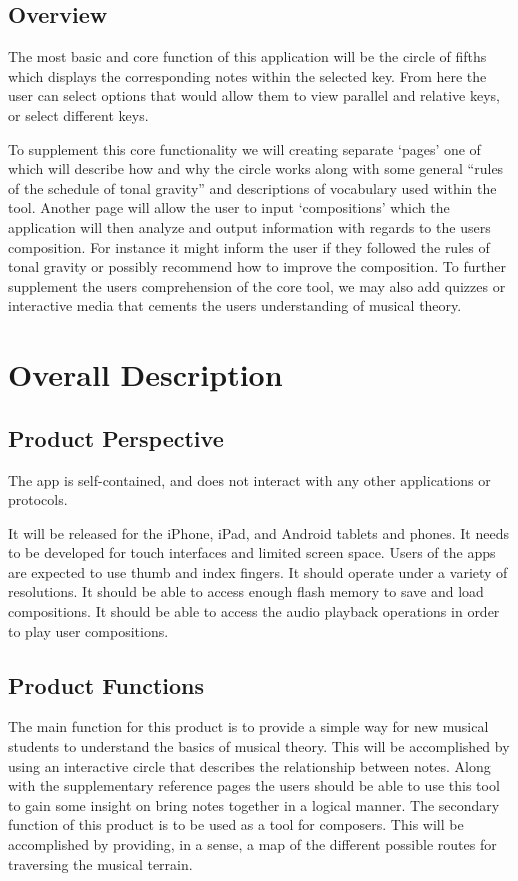 \documentclass[onecolumn, draftclsnofoot,10pt, compsoc]{IEEEtran}
\begin{document}
\subsection{Overview}
\par
The most basic and core function of this application will be the circle of fifths which displays the corresponding notes within the selected key. 
From here the user can select options that would allow them to view parallel and relative keys, or select different keys. 

\par
To supplement this core functionality we will creating separate ‘pages’ one of which will describe how and why the circle works along with some general “rules of the schedule of tonal gravity” and descriptions of vocabulary used within the tool.
Another page will allow the user to input ‘compositions’ which the application will then analyze and output information with regards to the users composition.
For instance it might inform the user if they followed the rules of tonal gravity or possibly recommend how to improve the composition.
To further supplement the users comprehension of the core tool, we may also add quizzes or interactive media that cements the users understanding of musical theory. 

\pagebreak
\section{Overall Description}
\subsection{Product Perspective}
\par
The app is self-contained, and does not interact with any other applications or protocols. 
\par 
It will be released for the iPhone, iPad, and Android tablets and phones.
It needs to be developed for touch interfaces and limited screen space.
Users of the apps are expected to use thumb and index fingers.
It should operate under a variety of resolutions.
It should be able to access enough flash memory to save and load compositions.
It should be able to access the audio playback operations in order to play user compositions.

\subsection{Product Functions}
\par
The main function for this product is to provide a simple way for new musical students to understand the basics of musical theory.
This will be accomplished by using an interactive circle that describes the relationship between notes.
Along with the supplementary reference pages the users should be able to use this tool to gain some insight on bring notes together in a logical manner.
The secondary function of this product is to be used as a tool for composers.
This will be accomplished by providing, in a sense, a map of the different possible routes for traversing the musical terrain. 
\end{document}
